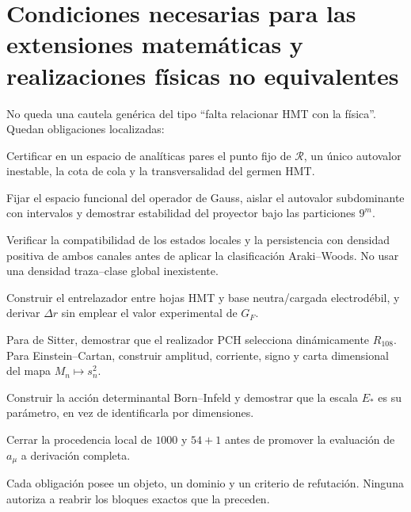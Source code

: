 \section{Condiciones necesarias para las extensiones matemáticas y realizaciones físicas no equivalentes}

No queda una cautela gen\'erica del tipo ``falta relacionar HMT con la
f\'isica''. Quedan obligaciones localizadas:

\begin{description}[style=nextline,leftmargin=37mm]
\item[CHAOS-OBL-1]
Certificar en un espacio de anal\'iticas pares el punto fijo de
\(\mathcal R\), un \'unico autovalor inestable, la cota de cola y la
transversalidad del germen HMT.

\item[GAUSS-OBL-1]
Fijar el espacio funcional del operador de Gauss, aislar el autovalor
subdominante con intervalos y demostrar estabilidad del proyector bajo las
particiones \(9^m\).

\item[HMOD-OBL-1]
Verificar la compatibilidad de los estados locales y la persistencia con
densidad positiva de ambos canales antes de aplicar la clasificaci\'on
Araki--Woods. No usar una densidad traza--clase global inexistente.

\item[EW-OBL-1]
Construir el entrelazador entre hojas HMT y base neutra/cargada electrod\'ebil,
y derivar \(\Delta r\) sin emplear el valor experimental de \(G_F\).

\item[COS-OBL-1]
Para de Sitter, demostrar que el realizador PCH selecciona din\'amicamente
\(R_{108}\). Para Einstein--Cartan, construir amplitud, corriente, signo y
carta dimensional del mapa \(M_n\mapsto s_n^2\).

\item[BORN-OBL-1]
Construir la acci\'on determinantal Born--Infeld y demostrar que la escala
\(E_*\) es su par\'ametro, en vez de identificarla por dimensiones.

\item[ANOM-OBL-1]
Cerrar la procedencia local de \(1000\) y \(54+1\) antes de promover la
evaluaci\'on de \(a_\mu\) a derivaci\'on completa.
\end{description}

Cada obligaci\'on posee un objeto, un dominio y un criterio de refutación. Ninguna autoriza a
reabrir los bloques exactos que la preceden.


